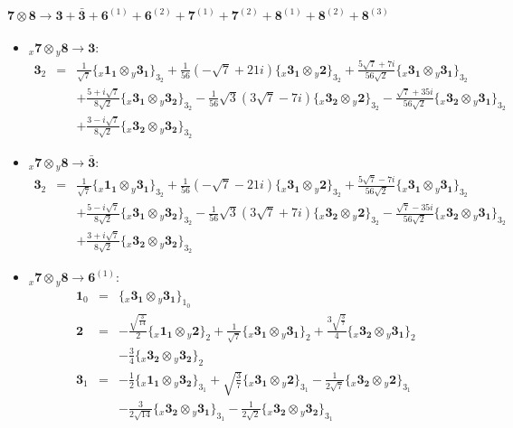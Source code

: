 \documentclass[english]{article}
\newcommand{\rep}[1]{\mathbf{#1}}
\newcommand{\repx}[2]{{}_{#2}\mathbf{#1}}
\newcommand{\subcg}[3]{\big\{ \repx{#1}{x}\otimes\repx{#2}{y}\big\}^{}_{#3}}
\begin{document}
\paragraph*{\Large $\rep{7}\otimes\rep{8}\to\rep{3}+\rep{\bar{3}}+\rep{6}^{(1)}+\rep{6}^{(2)}+\rep{7}^{(1)}+\rep{7}^{(2)}+\rep{8}^{(1)}+\rep{8}^{(2)}+\rep{8}^{(3)}$}
\begin{itemize}
\item $\repx{7}{x}\otimes\repx{8}{y}\to\rep{3}$:
\begin{eqnarray*}
\rep{3}_{2} &=& \frac{1}{\sqrt{7}}\subcg{1_{1}}{3_{1}}{3_{2}}+\frac{1}{56} \left(-\sqrt{7}+21 i\right)\subcg{3_{1}}{2}{3_{2}}+\frac{5 \sqrt{7}+7 i}{56 \sqrt{2}}\subcg{3_{1}}{3_{1}}{3_{2}} \\ 
 & & +\frac{5+i \sqrt{7}}{8 \sqrt{2}}\subcg{3_{1}}{3_{2}}{3_{2}}-\frac{1}{56} \sqrt{3} \left(3 \sqrt{7}-7 i\right)\subcg{3_{2}}{2}{3_{2}}-\frac{\sqrt{7}+35 i}{56 \sqrt{2}}\subcg{3_{2}}{3_{1}}{3_{2}} \\ 
 & & +\frac{3-i \sqrt{7}}{8 \sqrt{2}}\subcg{3_{2}}{3_{2}}{3_{2}}
\end{eqnarray*}
\item $\repx{7}{x}\otimes\repx{8}{y}\to\rep{\bar{3}}$:
\begin{eqnarray*}
\rep{3}_{2} &=& \frac{1}{\sqrt{7}}\subcg{1_{1}}{3_{1}}{3_{2}}+\frac{1}{56} \left(-\sqrt{7}-21 i\right)\subcg{3_{1}}{2}{3_{2}}+\frac{5 \sqrt{7}-7 i}{56 \sqrt{2}}\subcg{3_{1}}{3_{1}}{3_{2}} \\ 
 & & +\frac{5-i \sqrt{7}}{8 \sqrt{2}}\subcg{3_{1}}{3_{2}}{3_{2}}-\frac{1}{56} \sqrt{3} \left(3 \sqrt{7}+7 i\right)\subcg{3_{2}}{2}{3_{2}}-\frac{\sqrt{7}-35 i}{56 \sqrt{2}}\subcg{3_{2}}{3_{1}}{3_{2}} \\ 
 & & +\frac{3+i \sqrt{7}}{8 \sqrt{2}}\subcg{3_{2}}{3_{2}}{3_{2}}
\end{eqnarray*}
\item $\repx{7}{x}\otimes\repx{8}{y}\to\rep{6}^{(1)}$:
\begin{eqnarray*}
\rep{1}_{0} &=& \subcg{3_{1}}{3_{1}}{1_{0}}
\\
\rep{2} &=& -\frac{\sqrt{\frac{3}{14}}}{2}\subcg{1_{1}}{2}{2}+\frac{1}{\sqrt{7}}\subcg{3_{1}}{3_{1}}{2}+\frac{3 \sqrt{\frac{3}{7}}}{4}\subcg{3_{2}}{3_{1}}{2} \\ 
 & & -\frac{3}{4}\subcg{3_{2}}{3_{2}}{2}
\\
\rep{3}_{1} &=& -\frac{1}{2}\subcg{1_{1}}{3_{2}}{3_{1}}+\sqrt{\frac{3}{7}}\subcg{3_{1}}{2}{3_{1}}-\frac{1}{2 \sqrt{7}}\subcg{3_{2}}{2}{3_{1}} \\ 
 & & -\frac{3}{2 \sqrt{14}}\subcg{3_{2}}{3_{1}}{3_{1}}-\frac{1}{2 \sqrt{2}}\subcg{3_{2}}{3_{2}}{3_{1}}

\end{eqnarray*}
\end{itemize}
\end{document}

